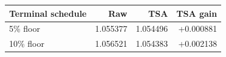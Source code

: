 \begin{tabular}{lrrr}
\toprule
Terminal schedule & Raw & TSA & TSA gain \\
\midrule
5\% floor & 1.055377 & 1.054496 & +0.000881 \\
10\% floor & 1.056521 & 1.054383 & +0.002138 \\
\bottomrule
\end{tabular}
